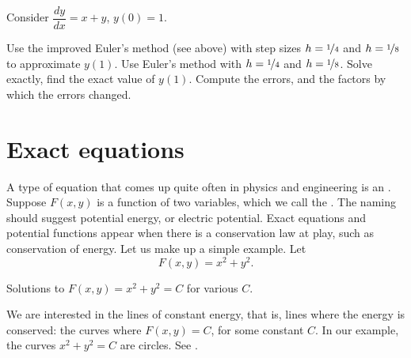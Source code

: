 \begin{exercise}
Consider $\dfrac{dy}{dx} = x+y$, $y(0)=1$.
\begin{tasks}
\task Use the improved Euler's method (see above) with step sizes $h=\nicefrac{1}{4}$ and $h=\nicefrac{1}{8}$
to approximate $y(1)$.
\task Use Euler's method with
$h=\nicefrac{1}{4}$ and $h=\nicefrac{1}{8}$.
\task Solve exactly, find the exact value of
$y(1)$.
\task Compute the errors, and the factors by which the errors changed.
\end{tasks}
\end{exercise}


\sectionnewpage
\section{Exact equations}
\label{exact:section}


A type of equation that comes up quite often in physics and
engineering is an
\emph{}.
Suppose $F(x,y)$ is a function of two variables, which we call the
\emph{}.  The naming should suggest 
potential energy, or electric potential.  Exact equations and potential
functions appear when there is a conservation law at play, such as 
conservation of energy.
Let us make up a simple example.  Let
\begin{equation*}
F(x,y) = x^2+y^2 .
\end{equation*}

\begin{mywrapfig}[16]{3.25in}
\capstart
{}
\caption{Solutions to $F(x,y) = x^2+y^2 = C$ for various
$C$.\label{exact:circlesfig}}
\end{mywrapfig}
We are interested in the lines of constant energy, that is, lines where
the energy is conserved:  the curves where $F(x,y) = C$,
for some constant $C$.  In
our example, the curves $x^2+y^2=C$ are circles.  See
.

